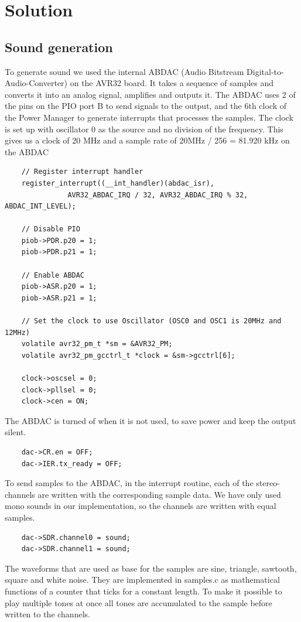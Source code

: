 \section{Solution}
\subsection{Sound generation}
To generate sound we used the internal ABDAC (Audio Bitstream Digital-to-Audio-Converter) on the AVR32 board. It takes a sequence of samples and converts it into an analog signal, amplifies and outputs it.
The ABDAC uses 2 of the pins on the PIO port B to send signals to the output, and the 6th clock of the Power Manager to generate interrupts that processes the samples. The clock is set up with oscillator 0 as the source and no division of the frequency. This gives us a clock of 20 MHz and a sample rate of 20MHz / 256 = 81.920 kHz on the ABDAC\\
\begin{lstlisting}
	// Register interrupt handler
	register_interrupt((__int_handler)(abdac_isr),
			   AVR32_ABDAC_IRQ / 32, AVR32_ABDAC_IRQ % 32, ABDAC_INT_LEVEL);

	// Disable PIO
	piob->PDR.p20 = 1;
	piob->PDR.p21 = 1;

	// Enable ABDAC
	piob->ASR.p20 = 1;
	piob->ASR.p21 = 1;

	// Set the clock to use Oscillator (OSC0 and OSC1 is 20MHz and 12MHz)
	volatile avr32_pm_t *sm = &AVR32_PM;
	volatile avr32_pm_gcctrl_t *clock = &sm->gcctrl[6];

	clock->oscsel = 0;
	clock->pllsel = 0;
	clock->cen = ON;
\end{lstlisting}
The ABDAC is turned of when it is not used, to save power and keep the output silent.\\
\begin{lstlisting}
	dac->CR.en = OFF;
	dac->IER.tx_ready = OFF;
\end{lstlisting}
To send samples to the ABDAC, in the interrupt routine, each of the stereo-channels are written with the corresponding sample data. We have only used mono sounds in our implementation, so the channels are written with equal samples.\\
\begin{lstlisting}
	dac->SDR.channel0 = sound;
	dac->SDR.channel1 = sound;
\end{lstlisting}
The waveforms that are used as base for the samples are sine, triangle, sawtooth, square and white noise. They are implemented in samples.c as mathematical functions of a counter that ticks for a constant length. To make it possible to play multiple tones at once all tones are accumulated to the sample before written to the channels.\\
